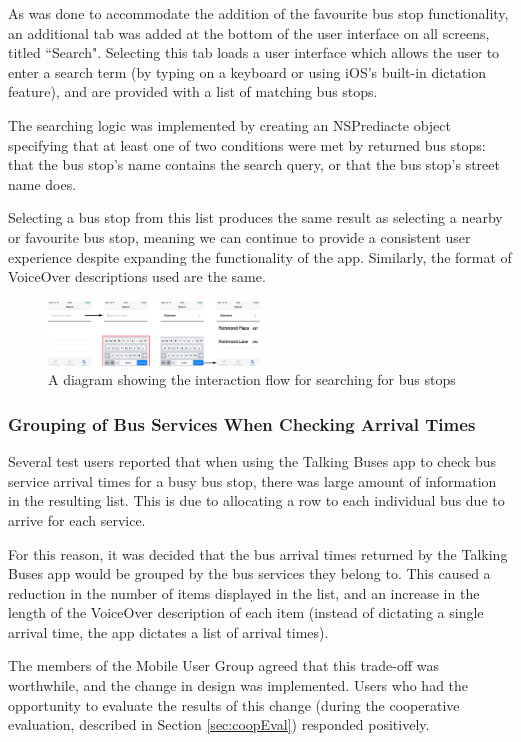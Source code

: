 \documentclass[10pt,twocolumn]{article}
\begin{document}
As was done to accommodate the addition of the favourite bus stop functionality, an additional tab was added at the bottom of the user interface on all screens, titled ``Search". Selecting this tab loads a user interface which allows the user to enter a search term (by typing on a keyboard or using iOS's built-in dictation feature), and are provided with a list of matching bus stops.

The searching logic was implemented by creating an NSPrediacte object specifying that at least one of two conditions were met by returned bus stops: that the bus stop's name contains the search query, or that the bus stop's street name does.

Selecting a bus stop from this list produces the same result as selecting a nearby or favourite bus stop, meaning we can continue to provide a consistent user experience despite expanding the functionality of the app. Similarly, the format of VoiceOver descriptions used are the same.

\begin{figure}[htbp]
  \centering
    \includegraphics[width=0.5\textwidth]{searchFlow}
    \caption{A diagram showing the interaction flow for searching for bus stops}
\end{figure}

\subsubsection{Grouping of Bus Services When Checking Arrival Times}
Several test users reported that when using the Talking Buses app to check bus service arrival times for a busy bus stop, there was large amount of information in the resulting list. This is due to allocating a row to each individual bus due to arrive for each service.

For this reason, it was decided that the bus arrival times returned by the Talking Buses app would  be grouped by the bus services they belong to. This caused a reduction in the number of items displayed in the list, and an increase in the length of the VoiceOver description of each item (instead of dictating a single arrival time, the app dictates a list of arrival times).

The members of the Mobile User Group agreed that this trade-off was worthwhile, and the change in design was implemented. Users who had the opportunity to evaluate the results of this change (during the cooperative evaluation, described in Section \ref{sec:coopEval}) responded positively.
\end{document}
